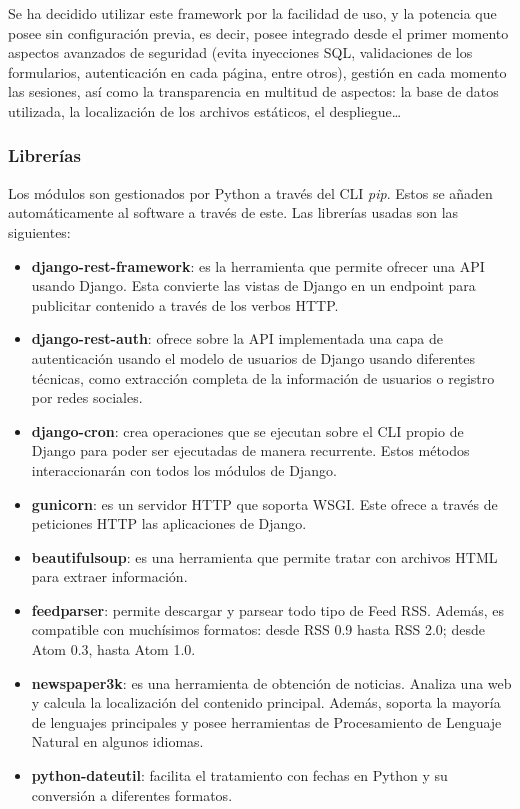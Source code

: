 Se ha decidido utilizar este framework por la facilidad de uso, y la potencia que posee sin configuración previa, es decir, posee integrado desde el primer momento aspectos avanzados de seguridad (evita inyecciones SQL, validaciones de los formularios, autenticación en cada página, entre otros), gestión en cada momento las sesiones, así como la transparencia en multitud de aspectos: la base de datos utilizada, la localización de los archivos estáticos, el despliegue…

\subsubsection{Librerías}
Los módulos son gestionados por Python a través del CLI \textit{pip}. Estos se añaden automáticamente al software a través de este. Las librerías usadas son las siguientes:

\begin{itemize}
    \item \textbf{django-rest-framework}: es la herramienta que permite ofrecer una API usando Django. Esta convierte las vistas de Django en un endpoint para publicitar contenido a través de los verbos HTTP.
    \item \textbf{django-rest-auth}: ofrece sobre la API implementada una capa de autenticación usando el modelo de usuarios de Django usando diferentes técnicas, como extracción completa de la información de usuarios o registro por redes sociales.
    \item \textbf{django-cron}: crea operaciones que se ejecutan sobre el CLI propio de Django para poder ser ejecutadas de manera recurrente. Estos métodos interaccionarán con todos los módulos de Django.
    \item \textbf{gunicorn}: es un servidor HTTP que soporta WSGI. Este ofrece a través de peticiones HTTP las aplicaciones de Django. 
    \item \textbf{beautifulsoup}: es una herramienta que permite tratar con archivos HTML para extraer información.
    \item \textbf{feedparser}: permite descargar y parsear todo tipo de Feed RSS. Además, es compatible con muchísimos formatos: desde RSS 0.9 hasta RSS 2.0; desde Atom 0.3, hasta Atom 1.0.
    \item \textbf{newspaper3k}: es una herramienta de obtención de noticias. Analiza una web y calcula la localización del contenido principal. Además, soporta la mayoría de lenguajes principales y posee herramientas de Procesamiento de Lenguaje Natural en algunos idiomas.
    \item \textbf{python-dateutil}: facilita el tratamiento con fechas en Python y su conversión a diferentes formatos.
\end{itemize}

